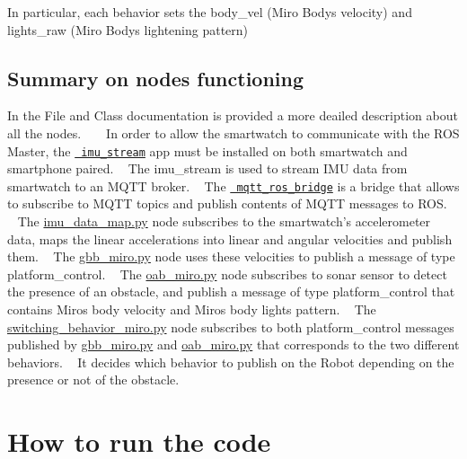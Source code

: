  In particular, each behavior sets the body\+\_\+vel (Miro Body\textquotesingle{}s velocity) and lights\+\_\+raw (Miro Body\textquotesingle{}s lightening pattern) \hypertarget{index_sum_dec}{}\subsection{Summary on nodes\textquotesingle{} functioning}\label{index_sum_dec}
In the File and Class documentation is provided a more deailed description about all the nodes. ~\newline
 ~\newline
 In order to allow the smartwatch to communicate with the R\+OS Master, the \href{https://github.com/EmaroLab/imu_stream}\texttt{ imu\+\_\+stream} app must be installed on both smartwatch and smartphone paired. ~\newline
 The imu\+\_\+stream is used to stream I\+MU data from smartwatch to an M\+Q\+TT broker. ~\newline
 The \href{https://github.com/EmaroLab/mqtt_ros_bridge/tree/feature/multiple_smartwatches}\texttt{ mqtt\+\_\+ros\+\_\+bridge} is a bridge that allows to subscribe to M\+Q\+TT topics and publish contents of M\+Q\+TT messages to R\+OS. ~\newline
 ~\newline
 The \mbox{\hyperlink{imu__data__map_8py}{imu\+\_\+data\+\_\+map.\+py}} node subscribes to the smartwatch’s accelerometer data, maps the linear accelerations into linear and angular velocities and publish them. ~\newline
 The \mbox{\hyperlink{gbb__miro_8py}{gbb\+\_\+miro.\+py}} node uses these velocities to publish a message of type platform\+\_\+control. ~\newline
 The \mbox{\hyperlink{oab__miro_8py}{oab\+\_\+miro.\+py}} node subscribes to sonar sensor to detect the presence of an obstacle, and publish a message of type platform\+\_\+control that contains Miro\textquotesingle{}s body velocity and Miro\textquotesingle{}s body lights pattern. ~\newline
 The \mbox{\hyperlink{switching__behavior__miro_8py}{switching\+\_\+behavior\+\_\+miro.\+py}} node subscribes to both platform\+\_\+control messages published by \mbox{\hyperlink{gbb__miro_8py}{gbb\+\_\+miro.\+py}} and \mbox{\hyperlink{oab__miro_8py}{oab\+\_\+miro.\+py}} that corresponds to the two different behaviors. ~\newline
 It decides which behavior to publish on the Robot depending on the presence or not of the obstacle. \hypertarget{index_hiw_sec}{}\section{How to run the code}\label{index_hiw_sec}
